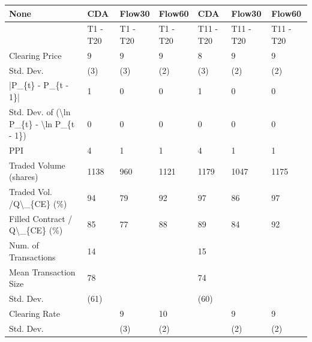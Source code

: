\begin{tabular}{lllllll}
\hline
 None                                                      & CDA      & Flow30    & Flow60    & CDA       & Flow30     & Flow60     \\
\hline
                                                           & T1 - T20 & T1 - T20 & T1 - T20 & T11 - T20 & T11 - T20 & T11 - T20 \\
 Clearing Price                                            & 9        & 9        & 9        & 8         & 9         & 9         \\
 Std. Dev.                                                 & (3)      & (3)      & (2)      & (3)       & (2)       & (2)       \\
 |P\_\{t\} - P\_\{t - 1\}|                                       & 1        & 0        & 0        & 1         & 0         & 0         \\
 Std. Dev. of (\textbackslash{}ln P\_\{t\} - \textbackslash{}ln P\_\{t - 1\})                  & 0        & 0        & 0        & 0         & 0         & 0         \\
 PPI                                                       & 4        & 1        & 1        & 4         & 1         & 1         \\
 Traded Volume (shares)                                    & 1138     & 960      & 1121     & 1179      & 1047      & 1175      \\
 Traded Vol. /Q\textbackslash{}\_\{CE\} (\%)                                  & 94       & 79       & 92       & 97        & 86        & 97        \\
 Filled Contract / Q\textbackslash{}\_\{CE\} (\%)                             & 85       & 77       & 88       & 89        & 84        & 92        \\
 Num. of Transactions                                      & 14       &          &          & 15        &           &           \\
 Mean Transaction Size                                     & 78       &          &          & 74        &           &           \\
 Std. Dev.                                                 & (61)     &          &          & (60)      &           &           \\
 Clearing Rate                                             &          & 9        & 10       &           & 9         & 9         \\
 Std. Dev.                                                 &          & (3)      & (2)      &           & (2)       & (2)       \\

\end{tabular}
